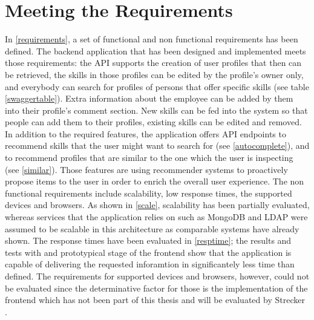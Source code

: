 \section{Meeting the Requirements}
In \ref{requirements}, a set of functional and non functional requirements has been defined. The backend application that has been designed and implemented meets those requirements: the API supports the creation of user profiles that then can be retrieved, the skills in those profiles can be edited by the profile's owner only, and everybody can search for profiles of persons that offer specific skills (see table \ref{swaggertable}). Extra information about the employee can be added by them into their profile's comment section. New skills can be fed into the system so that people can add them to their profiles, existing skills can be edited and removed. In addition to the required features, the application offers API endpoints to recommend skills that the user might want to search for (see \ref{autocomplete}), and
to recommend profiles that are similar to the one which the user is inspecting (see \ref{similar}). Those features are using recommender systems to
proactively propose items to the user in order to enrich the overall user experience.\newline
The non functional requirements include scalability, low response times, the supported devices and browsers.
As shown in \ref{scale}, scalability has been partially evaluated, whereas services that the application relies on such as MongoDB and LDAP were assumed to be scalable in this architecture as comparable systems have already shown. The response times have been evaluated in \ref{resptime}; the results and tests with and prototypical stage of the frontend show that the application is capable of delivering the requested inforamtion in significantely less time than defined.
The requirements for supported devices and browsers, however, could not be evaluated since the determinative factor for those is the implementation of the frontend which has not been part of this thesis and will be evaluated by Strecker \cite{strecker}.
